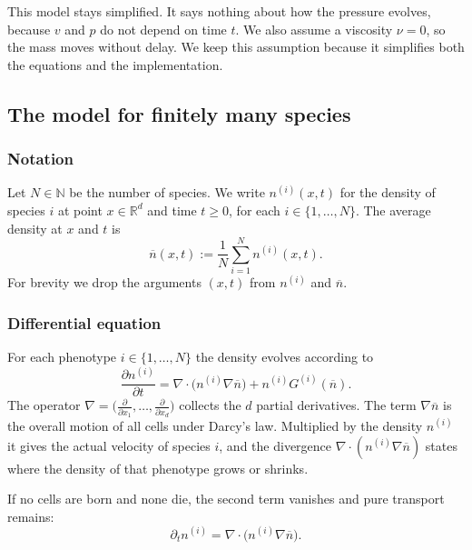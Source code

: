 \documentclass[11pt]{article}
\newcommand{\nbar}{\overline{n}}
\begin{document}
This model stays simplified. It says nothing about how the pressure evolves,
because $v$ and $p$ do not depend on time $t$. We also assume a viscosity $\nu =
0$, so the mass moves without delay. We keep this assumption because it simplifies
both the equations and the implementation.

\subsection{The model for finitely many species}
\subsubsection{Notation}
Let $N \in \mathbb{N}$ be the number of species. We write $n^{(i)}(x, t)$ for the
density of species $i$ at point $x \in \mathbb{R}^d$ and time $t \ge 0$, for each
$i \in \{1, \dots, N\}$. The average density at $x$ and $t$ is
\begin{equation}
    \nbar(x, t) := \frac{1}{N} \sum_{i=1}^{N} n^{(i)}(x, t).
\end{equation}
For brevity we drop the arguments $(x, t)$ from $n^{(i)}$ and $\nbar$.

\subsubsection{Differential equation}
For each phenotype $i \in \{1, \dots, N\}$ the density evolves according to
\begin{equation}
    \frac{\partial n^{(i)}}{\partial t}
    = \nabla \cdot \bigl( n^{(i)} \nabla \nbar \bigr) + n^{(i)} G^{(i)}(\nbar).
    \label{eq:pde}
\end{equation}
The operator $\nabla = \bigl( \tfrac{\partial}{\partial x_1}, \dots,
\tfrac{\partial}{\partial x_d} \bigr)$ collects the $d$ partial derivatives. The
term $\nabla \nbar$ is the overall motion of all cells under Darcy's law.
Multiplied by the density $n^{(i)}$ it gives the actual velocity of species $i$,
and the divergence $\nabla \cdot (n^{(i)} \nabla \nbar)$ states where the density
of that phenotype grows or shrinks.

If no cells are born and none die, the second term vanishes and pure transport
remains:
\begin{equation}
    \partial_t n^{(i)} = \nabla \cdot \bigl( n^{(i)} \nabla \nbar \bigr).
\end{equation}
\end{document}
